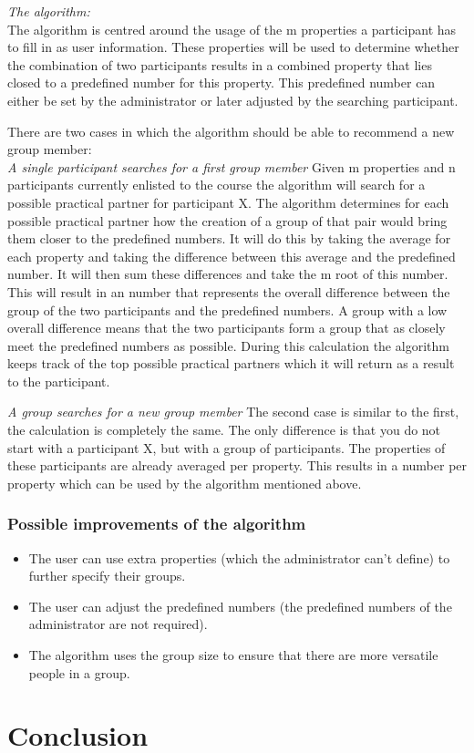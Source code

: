 \documentclass[]{article}
\begin{document}
\emph{The algorithm:}\\
The algorithm is centred around the usage of the m properties a participant has to fill in as user information.
These properties will be used to determine whether the combination of two participants results in a combined property that lies closed to a predefined number for this property.
This predefined number can either be set by the administrator or later adjusted by the searching participant.

There are two cases in which the algorithm should be able to recommend a new group member:\\
\emph{A single participant searches for a first group member}
Given m properties and n participants currently enlisted to the course the algorithm will search for a possible practical partner for participant X.
The algorithm determines for each possible practical partner how the creation of a group of that pair would bring them closer to the predefined numbers.
It will do this by taking the average for each property and taking the difference between this average and the predefined number.
It will then sum these differences and take the m root of this number.
This will result in an number that represents the overall difference between the group of the two participants and the predefined numbers.
A group with a low overall difference means that the two participants form a group that as closely meet the predefined numbers as possible.
During this calculation the algorithm keeps track of the top possible practical partners which it will return as a result to the participant.

\emph{A group searches for a new group member}
The second case is similar to the first, the calculation is completely the same.
The only difference is that you do not start with a participant X, but with a group of participants.
The properties of these participants are already averaged per property.
This results in a number per property which can be used by the algorithm mentioned above.

\subsubsection{Possible improvements of the algorithm}
\begin{itemize}
\item The user can use extra properties (which the administrator can't define) to further specify their groups.
\item The user can adjust the predefined numbers (the predefined numbers of the administrator are not required).
\item The algorithm uses the group size to ensure that there are more versatile people in a group.
\end{itemize}

\section{Conclusion}

\newpage


\end{document}
